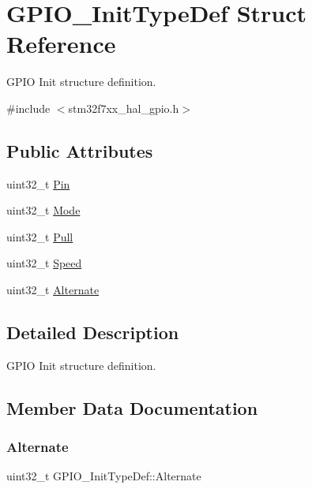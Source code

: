 \hypertarget{struct_g_p_i_o___init_type_def}{}\section{G\+P\+I\+O\+\_\+\+Init\+Type\+Def Struct Reference}
\label{struct_g_p_i_o___init_type_def}


G\+P\+IO Init structure definition.  




{\ttfamily \#include $<$stm32f7xx\+\_\+hal\+\_\+gpio.\+h$>$}

\subsection*{Public Attributes}
\begin{DoxyCompactItemize}
\item 
uint32\+\_\+t \mbox{\hyperlink{struct_g_p_i_o___init_type_def_aa807fb62b2b2cf937092abba81370b87}{Pin}}
\item 
uint32\+\_\+t \mbox{\hyperlink{struct_g_p_i_o___init_type_def_a3731d84343e65a98fdf51056a8d30321}{Mode}}
\item 
uint32\+\_\+t \mbox{\hyperlink{struct_g_p_i_o___init_type_def_aa2d3a6b0c4e10ac20882b4a37799ced1}{Pull}}
\item 
uint32\+\_\+t \mbox{\hyperlink{struct_g_p_i_o___init_type_def_aae3b8ba407fb4f974cbce9cc03fc189d}{Speed}}
\item 
uint32\+\_\+t \mbox{\hyperlink{struct_g_p_i_o___init_type_def_aa1bf7132c974a10589d6574d50465256}{Alternate}}
\end{DoxyCompactItemize}


\subsection{Detailed Description}
G\+P\+IO Init structure definition. 



\subsection{Member Data Documentation}
\mbox{\label{struct_g_p_i_o___init_type_def_aa1bf7132c974a10589d6574d50465256}} 
\subsubsection{\texorpdfstring{Alternate}{Alternate}}
{\footnotesize\ttfamily uint32\+\_\+t G\+P\+I\+O\+\_\+\+Init\+Type\+Def\+::\+Alternate}

